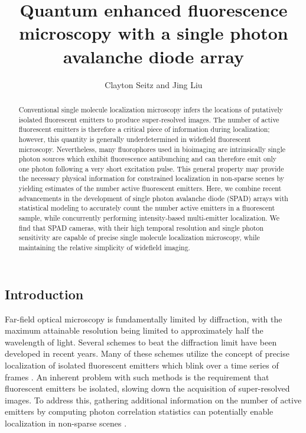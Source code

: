 \documentclass[a4paper, twocolumn, superscriptaddress,prl]{revtex4}  %
\begin{document}
\title{Quantum enhanced fluorescence microscopy with a single photon avalanche diode array}
\author{Clayton Seitz and Jing Liu}

\begin{abstract}
Conventional single molecule localization microscopy infers the locations of putatively isolated fluorescent emitters to produce super-resolved images. The number of active fluorescent emitters is therefore a critical piece of information during localization; however, this quantity is generally underdetermined in widefield fluorescent microscopy. Nevertheless, many fluorophores used in bioimaging are intrinsically single photon sources which exhibit fluorescence antibunching and can therefore emit only one photon following a very short excitation pulse. This general property may provide the necessary physical information for constrained localization in non-sparse scenes by yielding estimates of the number active fluorescent emitters. Here, we combine recent advancements in the development of single photon avalanche diode (SPAD) arrays with statistical modeling to accurately count the number active emitters in a fluorescent sample, while concurrently performing intensity-based multi-emitter localization. We find that SPAD cameras, with their high temporal resolution and single photon sensitivity are capable of precise single molecule localization microscopy, while maintaining the relative simplicity of widefield imaging. 
\end{abstract}

\maketitle 

\subsection{Introduction}

Far-field optical microscopy is fundamentally limited by diffraction, with the maximum attainable resolution being limited to approximately half the wavelength of light. Several schemes to beat the diffraction limit have been developed in recent years. Many of these schemes utilize the concept of precise localization of isolated fluorescent emitters which blink over a time series of frames \citep{Rust2006,Betzig2006}. An inherent problem with such methods is the requirement that fluorescent emitters be isolated, slowing down the acquisition of super-resolved images. To address this, gathering additional information on the number of active emitters by computing photon correlation statistics can potentially enable localization in non-sparse scenes \citep{Ta2010}. 
\end{document}
